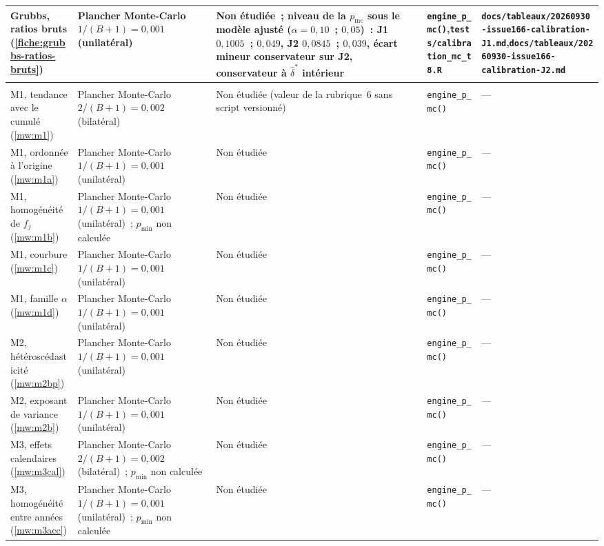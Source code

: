 \documentclass[a4paper,11pt]{article}
\newcommand{\code}[1]{\texttt{\small #1}}
\begin{document}
\begin{landscape}
\begin{center}
\begin{longtable}{@{}>{\raggedright\arraybackslash}p{2.5cm}>{\raggedright\arraybackslash}p{3.6cm}>{\raggedright\arraybackslash}p{4.0cm}>{\raggedright\arraybackslash}p{6.7cm}>{\raggedright\arraybackslash}p{7.2cm}@{}}
Grubbs, ratios bruts (\ref{fiche:grubbs-ratios-bruts}) & Plancher Monte-Carlo $1/(B+1) = 0{,}001$ (unilatéral) & Non étudiée~; niveau de la $p_{\mathrm{mc}}$ sous le modèle ajusté ($\alpha = 0{,}10$~; $0{,}05$)~: J1 $0{,}1005$~; $0{,}049$, J2 $0{,}0845$~; $0{,}039$, écart mineur conservateur sur J2, conservateur à $\hat\delta^{*}$ intérieur & \code{engine\_p\_mc()},\newline \code{tests/calibration\_mc\_t8.R} & \code{docs/tableaux/}\newline \code{20260930-issue166-calibration-J1.md},\newline \code{docs/tableaux/}\newline \code{20260930-issue166-calibration-J2.md} \\
\midrule
\multicolumn{5}{@{}l@{}}{\textbf{Méthode Merz--Wüthrich}} \\
\midrule
M1, tendance avec le cumulé (\ref{mw:m1}) & Plancher Monte-Carlo $2/(B+1) = 0{,}002$ (bilatéral) & Non étudiée (valeur de la rubrique~6 sans script versionné) & \code{engine\_p\_mc()} & --- \\
M1, ordonnée à l'origine (\ref{mw:m1a}) & Plancher Monte-Carlo $1/(B+1) = 0{,}001$ (unilatéral) & Non étudiée & \code{engine\_p\_mc()} & --- \\
M1, homogénéité de $f_j$ (\ref{mw:m1b}) & Plancher Monte-Carlo $1/(B+1) = 0{,}001$ (unilatéral)~; $p_{\min}$ non calculée & Non étudiée & \code{engine\_p\_mc()} & --- \\
M1, courbure (\ref{mw:m1c}) & Plancher Monte-Carlo $1/(B+1) = 0{,}001$ (unilatéral) & Non étudiée & \code{engine\_p\_mc()} & --- \\
M1, famille $\alpha$ (\ref{mw:m1d}) & Plancher Monte-Carlo $1/(B+1) = 0{,}001$ (unilatéral) & Non étudiée & \code{engine\_p\_mc()} & --- \\
M2, hétéroscédasticité (\ref{mw:m2bp}) & Plancher Monte-Carlo $1/(B+1) = 0{,}001$ (unilatéral) & Non étudiée & \code{engine\_p\_mc()} & --- \\
M2, exposant de variance (\ref{mw:m2b}) & Plancher Monte-Carlo $1/(B+1) = 0{,}001$ (unilatéral) & Non étudiée & \code{engine\_p\_mc()} & --- \\
M3, effets calendaires (\ref{mw:m3cal}) & Plancher Monte-Carlo $2/(B+1) = 0{,}002$ (bilatéral)~; $p_{\min}$ non calculée & Non étudiée & \code{engine\_p\_mc()} & --- \\
M3, homogénéité entre années (\ref{mw:m3acc}) & Plancher Monte-Carlo $1/(B+1) = 0{,}001$ (unilatéral)~; $p_{\min}$ non calculée & Non étudiée & \code{engine\_p\_mc()} & --- \\

\end{longtable}
\end{center}
\end{landscape}
\end{document}
